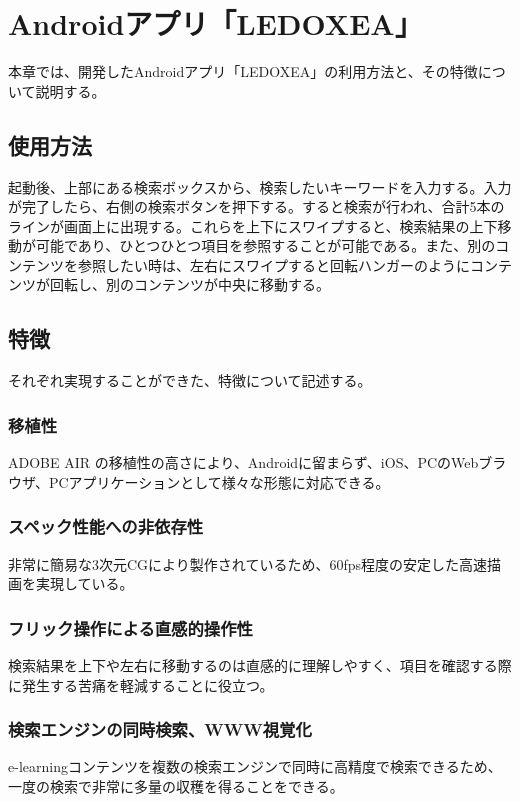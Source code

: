 \chapter{Androidアプリ「LEDOXEA」}
\label{chap:ledoxea}

本章では、開発したAndroidアプリ「LEDOXEA」の利用方法と、その特徴について説明する。

\section{使用方法}
起動後、上部にある検索ボックスから、検索したいキーワードを入力する。入力が完了したら、右側の検索ボタンを押下する。すると検索が行われ、合計5本のラインが画面上に出現する。これらを上下にスワイプすると、検索結果の上下移動が可能であり、ひとつひとつ項目を参照することが可能である。また、別のコンテンツを参照したい時は、左右にスワイプすると回転ハンガーのようにコンテンツが回転し、別のコンテンツが中央に移動する。

\section{特徴}
それぞれ実現することができた、特徴について記述する。

\subsection{移植性}
ADOBE AIR の移植性の高さにより、Androidに留まらず、iOS、PCのWebブラウザ、PCアプリケーションとして様々な形態に対応できる。

\subsection{スペック性能への非依存性}
非常に簡易な3次元CGにより製作されているため、60fps程度の安定した高速描画を実現している。

\subsection{フリック操作による直感的操作性}
検索結果を上下や左右に移動するのは直感的に理解しやすく、項目を確認する際に発生する苦痛を軽減することに役立つ。

\subsection{検索エンジンの同時検索、WWW視覚化}
e-learningコンテンツを複数の検索エンジンで同時に高精度で検索できるため、一度の検索で非常に多量の収穫を得ることをできる。